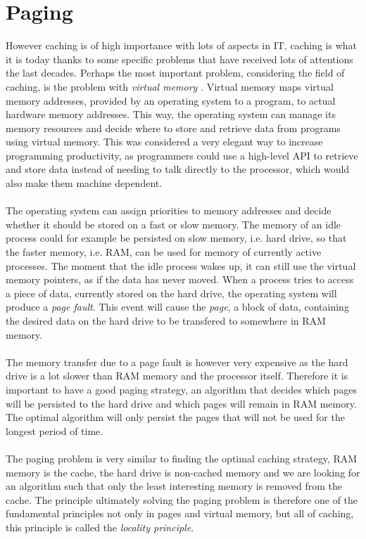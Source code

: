 \documentclass[pdftex,a4paper,12pt,twoside]{report}
\begin{document}
\section{Paging}
However caching is of high importance with lots of aspects in IT, caching is what it is today thanks to some specific problems that have received lots of attentions the last decades. Perhaps the most important problem, considering the field of caching, is the problem with \emph{virtual memory} \citep{denning1970virtual}. Virtual memory maps virtual memory addresses, provided by an operating system to a program, to actual hardware memory addresses. This way, the operating system can manage its memory resources and decide where to store and retrieve data from programs using virtual memory. This was considered a very elegant way to increase programming productivity, as programmers could use a high-level API to retrieve and store data instead of needing to talk directly to the processor, which would also make them machine dependent.
\\\\
The operating system can assign priorities to memory addresses and decide whether it should be stored on a fast or slow memory. The memory of an idle process could for example be persisted on slow memory, i.e. hard drive, so that the faster memory, i.e. RAM, can be used for memory of currently active processes. The moment that the idle process wakes up, it can still use the virtual memory pointers, as if the data has never moved. When a process tries to access a piece of data, currently stored on the hard drive, the operating system will produce a \emph{page fault}. This event will cause the \emph{page}, a block of data, containing the desired data on the hard drive to be transfered to somewhere in RAM memory.
\\\\
The memory transfer due to a page fault is however very expensive as the hard drive is a lot slower than RAM memory and the processor itself. Therefore it is important to have a good paging strategy, an algorithm that decides which pages will be persisted to the hard drive and which pages will remain in RAM memory. The optimal algorithm will only persist the pages that will not be used for the longest period of time.
\\\\
The paging problem is very similar to finding the optimal caching strategy, RAM memory is the cache, the hard drive is non-cached memory and we are looking for an algorithm such that only the least interesting memory is removed from the cache. The principle ultimately solving the paging problem is therefore one of the fundamental principles not only in pages and virtual memory, but all of caching, this principle is called the \emph{locality principle}.
\\\\
\end{document}
